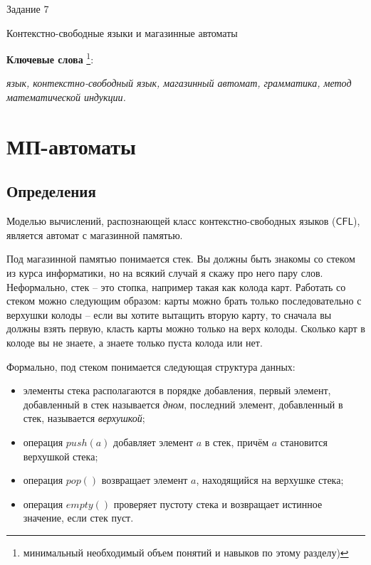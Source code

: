 \documentclass[12pt]{article}
\theoremstyle{definiton}
\theoremstyle{definition}
\theoremstyle{definition}
\def\CFL{{\mathsf{CFL}}}
\begin{document}
\centerline{\LARGE Задание 7}

\medskip

\begin{center}
	{\Large Контекстно-свободные языки и магазинные автоматы}
\end{center}

\bigskip



{\bf Ключевые слова }\footnote{минимальный необходимый объем понятий и навыков по
этому разделу)}:{\em  язык, контекстно-свободный язык, магазинный автомат, грамматика, метод математической индукции. %

}

\section{МП-автоматы }

\subsection{Определения}

Моделью вычислений, распознающей класс контекстно-свободных языков ($\CFL$), является автомат с магазинной памятью.

Под магазинной памятью понимается стек. Вы должны быть знакомы со стеком из курса информатики, но на всякий случай я скажу про него пару слов. Неформально, стек -- это стопка, например такая как колода карт. Работать со стеком можно следующим образом: карты можно брать только последовательно с верхушки колоды -- если вы хотите вытащить вторую карту, то сначала вы должны взять первую, класть карты можно только на верх колоды. Сколько карт в колоде вы не знаете, а знаете только пуста колода или нет. 

Формально,  под стеком понимается следующая структура данных:
\begin{itemize}
	\item  элементы стека располагаются в порядке добавления, первый элемент, добавленный в стек называется \emph{дном}, последний элемент, добавленный в стек, называется \emph{верхушкой};
	\item  операция $push(a)$ добавляет элемент $a$ в стек, причём $a$ становится верхушкой стека;
	\item  операция $pop()$ возвращает элемент $a$, находящийся на верхушке стека;
	\item операция $empty()$ проверяет пустоту стека и возвращает истинное значение, если стек пуст.
\end{itemize}
\end{document}
